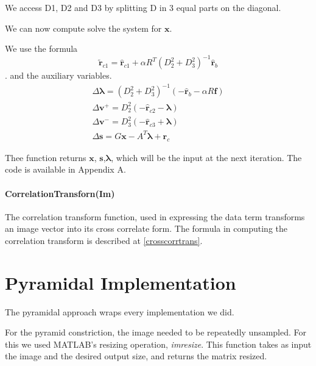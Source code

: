 \documentclass[12pt,a4paper,twoside]{report}
\begin{document}
{We access D1, D2 and D3 by splitting D in 3 equal parts on the diagonal.

We can now compute solve the system for $\boldsymbol{x}$.

 We use the formula $$\tilde{\boldsymbol{r}}_{c1} = \hat{\boldsymbol{r}}_{c1} + \alpha R ^T( D_2^{2} +  D_3^{2} )^{-1} \hat{\boldsymbol{r}}_{b}$$.
 and the auxiliary variables.
 \begin{equation}
 \begin{split}
 \Delta\boldsymbol{\lambda} = ( D_2^{2} +  D_3^{2} )^{-1}
 (-\hat{\boldsymbol{r}}_{b} - \alpha R \boldsymbol{f})\\
 \Delta\boldsymbol{v}^+ = D_2^{2}(-\hat{\boldsymbol{r}}_{c2} - \boldsymbol{\lambda})\\
 \Delta\boldsymbol{v}^- = D_3^{2}(-\hat{\boldsymbol{r}}_{c3} + \boldsymbol{\lambda})\\
 \Delta\boldsymbol{s} =  G  \boldsymbol{x} -  A^T\boldsymbol{\lambda} + \boldsymbol{r}_c
 \end{split}
 \end{equation}
 
 Thee function returns $\boldsymbol{x}$, $\boldsymbol{s}$,$\boldsymbol{\lambda}$, which will be the input at the next iteration. The code is available in Appendix A.

\paragraph{CorrelationTransforn(Im)}

The correlation transform function, used in expressing the data term transforms an image vector into its cross correlate form. The formula in computing the correlation transform is described at \ref{crosscorrtrans}.

 

\section{Pyramidal Implementation} \label{pyr}
The pyramidal approach wraps every implementation we did. 

For the pyramid constriction, the image needed to be repeatedly unsampled. For this we used MATLAB's resizing operation,  \textit{imresize}. This function takes as input the image and the desired output size, and returns the matrix resized. 

}
\end{document}
